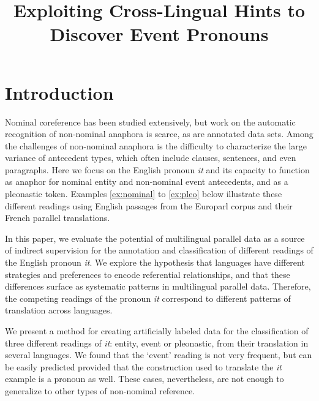 \documentclass[10pt, a4paper]{article}
\title{Exploiting Cross-Lingual Hints to Discover Event Pronouns}
\begin{document}
\maketitleabstract

\section{Introduction}

\renewcommand{\thefootnote}{\fnsymbol{footnote}}


Nominal coreference has been studied extensively, but work on the automatic 
recognition of non-nominal anaphora is scarce, as are annotated data sets. Among 
the challenges of non-nominal anaphora is the difficulty to characterize the 
large variance of antecedent types, which often include clauses, sentences, and 
even paragraphs. Here we focus on the English pronoun \textit{it} and its 
capacity to function as anaphor for nominal entity and non-nominal event 
antecedents, and as a pleonastic token. Examples \ref{ex:nominal} to 
\ref{ex:pleo} below illustrate these different readings using English passages 
from the Europarl corpus and their French parallel translations.


In this paper, we evaluate the potential of multilingual parallel data as a 
source of indirect supervision for the annotation and classification of 
different readings of the English 
pronoun \textit{it}. We explore the hypothesis that languages have different 
strategies and preferences to encode referential relationships, and that these 
differences surface as systematic patterns in multilingual parallel data. 
Therefore, the competing readings of the pronoun \textit{it} correspond to different patterns of translation across languages.  

We present a method for creating artificially labeled data for the 
classification of three different readings of \textit{it}: entity, event or 
pleonastic, from their translation in several languages. We found that the 
`event' reading is not very frequent, but can be easily predicted provided that 
the construction used to translate the \textit{it} example is a pronoun as well. These 
cases, nevertheless, are not enough to generalize to other types of non-nominal 
reference. %
\end{document}
